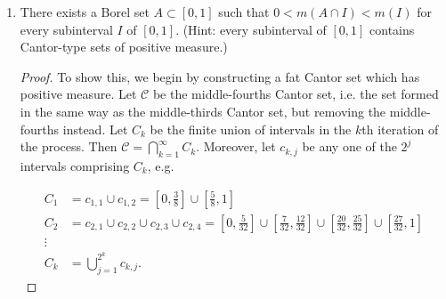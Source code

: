 \documentclass[11pt,oneside,english]{amsart}
\theoremstyle{definition}
\newcommand{\MC}[1]{\mathcal{#1}}
\begin{document}
\begin{enumerate}
\begin{proof}
\begin{align*}
m(E_1)&=m(E_1+\delta)\leq m(I\setminus E)=m(I\cap E^c)=m(I)-m(E\cap I)\text{, and}\\[2mm]
m(E_2)&=m(E_2-\delta)\leq m(I\setminus E)=m(I\cap E^c)=m(I)-m(E\cap I).
\end{align*}


Consequently, 

\begin{align*}
m(E\cap I)=m(E_1)+m(E_2)&\leq 2m(I)-2m(E\cap I)\\[2mm]
3m(E\cap I)&\leq 2m(I)\\[2mm]
m(E\cap I)&\leq\frac{2}{3}m(I)\\[2mm]
\frac{3}{4}m(I)<m(E\cap I)&\leq\frac{2}{3}m(I),
\end{align*}

which is a contradiction. Therefore, $E-E$ contains an interval centered at 0.


\end{proof}


\setcounter{enumi}{32}

\item There exists a Borel set $A\subset [0,1]$ such that $0<m(A\cap I)<m(I)$ for every subinterval $I$ of $[0,1]$. (Hint: every subinterval of $[0,1]$ contains Cantor-type sets of positive measure.)

\begin{proof}

To show this, we begin by constructing a fat Cantor set which has positive measure. Let $\MC{C}$ be the middle-fourths Cantor set, i.e. the set formed in the same way as the middle-thirds Cantor set, but removing the middle-fourths instead. Let $C_k$ be the finite union of intervals in the $k$th iteration of the process. Then $\MC{C}=\bigcap_{k=1}^\infty C_k$. Moreover, let $c_{k,j}$ be any one of the $2^j$ intervals comprising $C_k$, e.g.

\begin{align*}
 C_1&=c_{1,1}\cup c_{1,2}=\left[0,\frac{3}{8}\right]\cup\left[\frac{5}{8},1\right]\\[2mm]
 C_2&=c_{2,1}\cup c_{2,2}\cup c_{2,3}\cup c_{2,4}=\left[0,\frac{5}{32}\right]\cup\left[\frac{7}{32},\frac{12}{32}\right]\cup\left[\frac{20}{32},\frac{25}{32}\right]\cup\left[\frac{27}{32},1\right]\\[2mm]
 \vdots&\\[2mm]
 C_k&=\bigcup_{j=1}^{2^k}c_{k,j}.
\end{align*}


\end{proof}
\end{enumerate}
\end{document}
